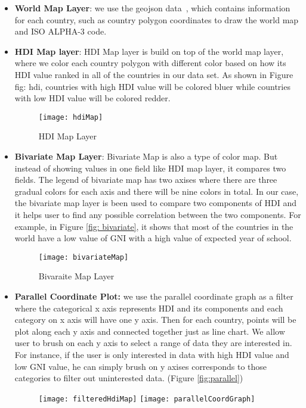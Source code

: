 \begin{itemize}
	\item \textbf{World Map Layer}: we use the geojson data~\cite{geocountries}, which contains information for each country, such as country polygon coordinates to draw the world map and ISO ALPHA-3 code.
	\item \textbf{HDI Map layer}: HDI Map layer is build on top of the world map layer, where we color each country polygon with different color based on how its HDI value ranked in all of the countries in our data set. As shown in Figure {fig: hdi}, countries with high HDI value will be colored bluer while countries with low HDI value will be colored redder.
	\begin{figure}[h!]
		\texttt{[image: hdiMap]}
		\caption{HDI Map Layer}
		\label{fig:hdi}
	\end{figure}
	\item \textbf{Bivariate Map Layer}: Bivariate Map is also a type of color map. But instead of showing values in one field like HDI map layer, it compares two fields. The legend of bivariate map has two axises where there are three gradual colors for each axis and there will be nine colors in total. In our case, the bivariate map layer is been used to compare two components of HDI and it helps user to find any possible correlation between the two components. For example, in Figure \ref{fig: bivariate}, it shows that most of the countries in the world have a low value of GNI with a high value of expected year of school.
	\begin{figure}[h!]
		\texttt{[image: bivariateMap]}
		\caption{Bivaraite Map Layer}
		\label{fig:bivariate}
	\end{figure}
	\item \textbf{Parallel Coordinate Plot:} we use the parallel coordinate graph as a filter where the categorical x axis represents HDI and its components and each category on x axis will have one y axis. Then for each country, points will be plot along each y axis and connected together just as line chart. We allow user to brush on each y axis to select a range of data they are interested in. For instance, if the user is only interested in data with high HDI value and low GNI value, he can simply brush on y axises corresponds to those categories to filter out uninterested data. (Figure \ref{fig:parallel})
	\begin{figure}[h!]
		\texttt{[image: filteredHdiMap]}
		\texttt{[image: parallelCoordGraph]}

\end{figure}
\end{itemize}
